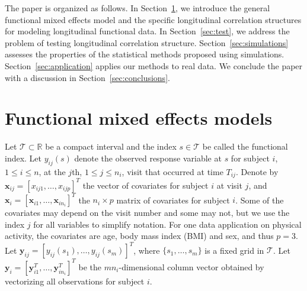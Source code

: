 \documentclass[submit]{smj}
\def\by{\mathbf{y}}
\def\bx {\mathbf{x}}
\def\by{\mathbf{y}}
\begin{document}
The paper is organized as follows. In Section~\ref{sec:sec2},  we 
introduce the general functional mixed effects model and the specific longitudinal correlation structures for modeling longitudinal functional data. In Section~\ref{sec:test}, we address the problem of testing longitudinal correlation structure. Section~\ref{sec:simulations} assesses the properties of the statistical methods proposed using simulations.  Section~\ref{sec:application} applies our methods to real data. We conclude the paper with a discussion in Section~\ref{sec:conclusions}.

\section{Functional mixed effects models} \label{sec:sec2}

Let $\mathcal{T}\subset \mathbb{R}$ be a compact interval and the index $s\in \mathcal{T}$ be called the functional index. Let $y_{ij}(s)$ denote the observed response variable at $s$ for subject $i$,  $1\leq i\leq n$, at the $j$th,  $1\leq j\leq n_i$, visit that occurred at time $T_{ij}$. Denote by $\bx_{ij}  = [x_{ij1},\ldots, x_{ijp}]^{T}$ the vector of covariates for subject $i$ at visit $j$, and $\bx_i = [\bx_{i1}, \dots, \bx_{in_i}]^{T}$ the $n_i \times p$ matrix of covariates for subject $i$. Some of the covariates may depend on the visit number and some may not, but we use the index $j$ for all variables to simplify notation. For one data application on physical activity,  the covariates are age, body mass index (BMI) and sex, and thus $p=3$. Let $\by_{ij} = [y_{ij}(s_1),\ldots, y_{ij}(s_m)]^{T}$, where $\{s_1,\ldots, s_m\}$ is a fixed grid in $\mathcal{T}$. Let $\by_i = [\by^{T}_{i1},\ldots, \by^{T}_{in_i}]^{T}$ be the $mn_i$-dimensional column vector obtained by vectorizing all observations for subject $i$. 
\end{document}
